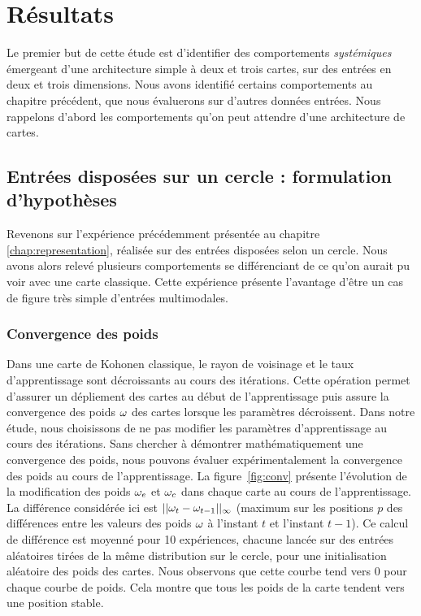 \documentclass[../main]{subfiles}
\begin{document}
\section{Résultats}

Le premier but de cette étude est d'identifier des comportements \emph{systémiques} émergeant d'une architecture simple à deux et trois cartes, sur des entrées en deux et trois dimensions.
Nous avons identifié certains comportements au chapitre précédent, que nous évaluerons sur d'autres données entrées. Nous rappelons d'abord les comportements qu'on peut attendre d'une architecture de cartes.

\subsection{Entrées disposées sur un cercle : formulation d'hypothèses}

Revenons sur l'expérience précédemment présentée au chapitre \ref{chap:representation}, réalisée sur des entrées disposées selon un cercle.
 Nous avons alors relevé plusieurs comportements se différenciant de ce qu'on aurait pu voir avec une carte classique. 
 Cette expérience présente l'avantage d'être un cas de figure très simple d'entrées multimodales.

\subsubsection{Convergence des poids}

Dans une carte de Kohonen classique, le rayon de voisinage et le taux d'apprentissage sont décroissants au cours des itérations. Cette opération permet d'assurer un dépliement des cartes au début de l'apprentissage puis assure la convergence des poids $\omega$ des cartes lorsque les paramètres décroissent.
Dans notre étude, nous choisissons de ne pas modifier les paramètres d'apprentissage au cours des itérations.
Sans chercher à démontrer mathématiquement une convergence des poids, nous pouvons évaluer expérimentalement la convergence des poids au cours de l'apprentissage.
La figure~\ref{fig:conv} présente l'évolution de la modification des poids $\omega_{e}$ et $\omega_{c}$ dans chaque carte au cours de l'apprentissage. La différence considérée ici est $||\omega_t - \omega_{t-1}||_{\infty}$ (maximum sur les positions $p$ des différences entre les valeurs des poids $\omega$ à l'instant $t$ et l'instant $t-1$). 
Ce calcul de différence est moyenné pour 10 expériences, chacune lancée sur des entrées aléatoires tirées de la même distribution sur le cercle, pour une initialisation aléatoire des poids des cartes.
Nous observons que cette courbe tend vers $0$ pour chaque courbe de poids. Cela montre que tous les poids de la carte tendent vers une position stable.
\end{document}

